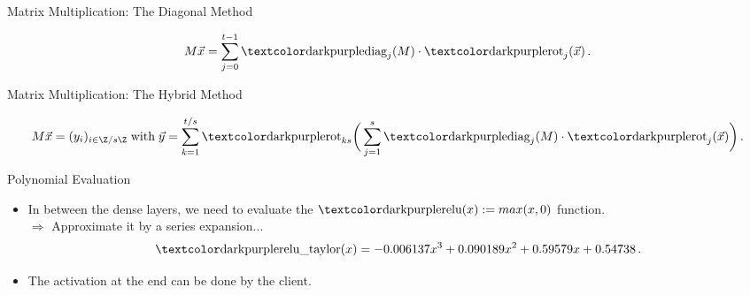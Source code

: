 \begin{frame}{Matrix Multiplication: The Diagonal Method}
  \begin{figure}[H]
    \centering
    \hspace{\matmulhoffset}
    \label{fig:diagonal-method}
  \end{figure}

  $$M \vec{x} = \sum_{j=0}^{t-1} \diag_j(M) \cdot \rot_j(\vec{x}) \,.$$
\end{frame}

\begin{frame}{Matrix Multiplication: The Hybrid Method}
  \begin{figure}[H]
    \centering
    \hspace{\matmulhoffset}
    \label{fig:hybrid-method}
  \end{figure}

  $$M \vec{x} = (y_i)_{i \in \Z/s\Z} \;\text{with}\; \vec{y} = \sum_{k=1}^{t / s} \rot_{ks}\bigg(\sum_{j=1}^s \diag_j(M) \cdot \rot_j(\vec{x})\bigg) \,.$$
\end{frame}

\begin{frame}{Polynomial Evaluation}
  \begin{itemize}
    \item In between the dense layers, we need to evaluate the $\cryptop{relu}(x) := max(x, 0)$ function. \\
          $\Rightarrow$ Approximate it by a series expansion...
          $$\cryptop{relu\_taylor}(x) = -0.006137 x^3 + 0.090189 x^2 + 0.59579 x + 0.54738 \,.$$
    \item The  activation at the end can be done by the client.
  \end{itemize}

  \begin{figure}[H]
    \centering
    \label{fig:taylor-relu}
  \end{figure}
\end{frame}

